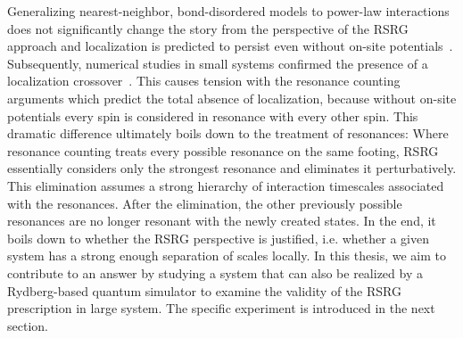 Generalizing nearest-neighbor, bond-disordered models to power-law interactions does not significantly change the story from the perspective of the RSRG approach and localization is predicted to persist even without on-site potentials~\cite{moureManyBodyLocalizationTransition2015,moureDisorderedQuantumSpin2018,kutlinRenormalizationLocalizationSmall2020}. Subsequently, numerical studies in small systems confirmed the presence of a localization crossover~\cite{mohdebEntanglementPropertiesDisordered2020,mohdebExcitedEigenstateEntanglementProperties2022,mohdebGlobalQuenchDynamics2023}.
This causes tension with the resonance counting arguments which predict the total absence of localization, because without on-site potentials every spin is considered in resonance with every other spin.
This dramatic difference ultimately boils down to the treatment of resonances: Where resonance counting treats every possible resonance on the same footing, RSRG essentially considers only the strongest resonance and eliminates it perturbatively. This elimination assumes a strong hierarchy of interaction timescales associated with the resonances. After the elimination, the other previously possible resonances are no longer resonant with the newly created states. In the end, it boils down to whether the RSRG perspective is justified, i.e. whether a given system has a strong enough separation of scales locally. 
In this thesis, we aim to contribute to an answer by studying a system that can also be realized by a Rydberg-based quantum simulator to examine the validity of the RSRG prescription in large system. The specific experiment is introduced in the next section.






